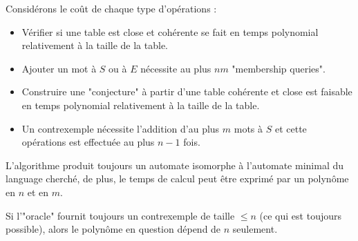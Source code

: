 Considérons le coût de chaque type d'opérations :
\begin{itemize}
	\item Vérifier si une table est close et cohérente se fait en temps polynomial relativement à la taille de la table.
	\item Ajouter un mot à $S$ ou à $E$ nécessite au plus $nm$ "membership queries".
	\item Construire une "conjecture" à partir d'une table cohérente et close est faisable en temps polynomial relativement à
	      la taille de la table.
	\item Un contrexemple nécessite l'addition d'au plus $m$ mots à $S$ et cette opérations est effectuée au plus $n-1$ fois.
\end{itemize}

\begin{theorem}
	L'algorithme produit toujours un automate isomorphe à l'automate minimal du language cherché, de plus, le temps de calcul peut être
	exprimé par un polynôme en $n$ et en $m$.
\end{theorem}

\begin{remarque}
	Si l'"oracle" fournit toujours un contrexemple de taille $\leq n$ (ce qui est toujours possible), alors le polynôme en question dépend de $n$ seulement.
\end{remarque}

